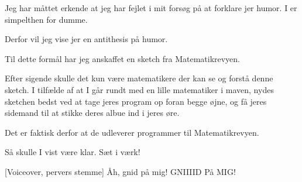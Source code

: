\documentclass[a4paper,11pt]{article}
\begin{document}
    
  \begin{sketch}












 Jeg har måttet erkende at jeg har fejlet i mit forsøg på at forklare jer humor. I er simpelthen for dumme.

 Derfor vil jeg vise jer en antithesis på humor.

 Til dette formål har jeg anskaffet en sketch fra Matematikrevyen. 

 Efter sigende skulle det kun være matematikere der kan se og forstå denne sketch. I tilfælde af at I går rundt med en lille matematiker i maven, nydes sketchen bedst ved at tage jeres program op foran begge øjne, og få jeres sidemand til at stikke deres albue ind i jeres øre.

 Det er faktisk derfor at de udleverer programmer til Matematikrevyen.

 Så skulle I vist være klar. Sæt i værk!




    [Voiceover, pervers stemme] Åh, gnid på mig! GNIIIID På MIG!


\end{sketch}
\end{document}
